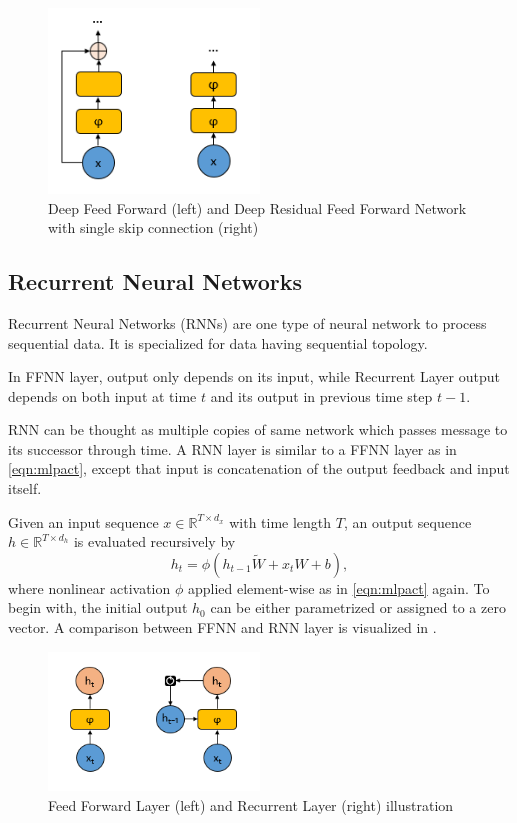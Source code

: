 \begin{figure}
	\centering
	\includegraphics[width=0.5\textwidth]{figures/ml_theory/rffnn_vs_ffnn.png}
	\caption{Deep Feed Forward (left) and Deep Residual Feed Forward Network with single skip connection (right)}
	\label{fig:rffnn_ffnn}
\end{figure}

\subsection{Recurrent Neural Networks}

Recurrent Neural Networks (RNNs) \cite{rumelhart_learning_1986} are one type of neural network to process sequential data. 
It is specialized for data having sequential topology. 

In FFNN layer, output only depends on its input, while Recurrent Layer output depends on both input at time $t$ and its output in previous time step $t-1$. 

RNN can be thought as multiple copies of same network which passes message to its successor through time. 
A RNN layer is similar to a FFNN layer as in \eqref{eqn:mlpact}, 
except that input is concatenation of the output feedback and input itself.

Given an input sequence $x \in \mathbb{R}^{T \times d_x}$ with time length $T$, an output sequence $h \in \mathbb{R}^{T \times d_h}$ is evaluated recursively by 
\begin{equation}
\label{eqn:rnnact}
h_t = \phi(h_{t-1} \tilde{W} + x_t W + b),
\end{equation}
where nonlinear activation $\phi$ applied element-wise as in \ref{eqn:mlpact} again. 
To begin with, the initial output $h_0$ can be either parametrized or assigned to a zero vector. A comparison between FFNN and RNN layer is visualized in .

\begin{figure}
	\centering
	\includegraphics[width=0.5\textwidth]{figures/ml_theory/ffnn_vs_rnn.png}
	\caption{Feed Forward Layer (left) and Recurrent Layer (right) illustration~\cite{olah_understanding_2015}}
	\label{fig:rnn_vs_ffnn}
\end{figure}

